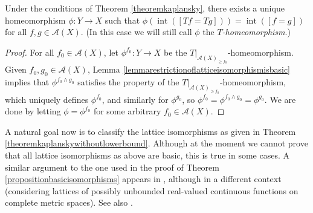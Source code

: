 \begin{theorem}\label{theoremkaplanskywithoutlowerbound}
Under the conditions of Theorem \ref{theoremkaplansky}, there exists a unique homeomorphism $\phi:Y\to X$ such that $\phi(\operatorname{int}([Tf=Tg]))=\operatorname{int}([f=g])$ for all $f,g\in\mathcal{A}(X)$. (In this case we will still call $\phi$ the \emph{$T$-homeomorphism}.)
\end{theorem}
\begin{proof}
For all $f_0\in \mathcal{A}(X)$, let $\phi^{f_0}:Y\to X$ be the $T|_{\mathcal{A}(X)_{\geq f_0}}$-homeomorphism. Given $f_0,g_0\in\mathcal{A}(X)$, Lemma \ref{lemmarestrictionoflatticeisomorphismisbasic} implies that $\phi^{f_0\land g_0}$ satisfies the property of the $T|_{\mathcal{A}(X)_{\geq f_0}}$-homeomorphism, which uniquely defines $\phi^{f_0}$, and similarly for $\phi^{g_0}$, so $\phi^{f_0}=\phi^{f_0\land g_0}=\phi^{g_0}$. We are done by letting $\phi=\phi^{f_0}$ for some arbitrary $f_0\in\mathcal{A}(X)$.\qedhere
\end{proof}

A natural goal now is to classify the lattice isomorphisms as given in Theorem \ref{theoremkaplanskywithoutlowerbound}. Although at the moment we cannot prove that all lattice isomorphisms as above are basic, this is true in some cases. A similar argument to the one used in the proof of Theorem \ref{propositionbasicisomorphisms} appears in \cite{MR2995073}, although in a different context (considering lattices of possibly unbounded real-valued continuous functions on complete metric spaces). See also \cite{MR2999998,MR3404615}.

